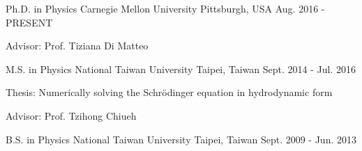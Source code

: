 


\begin{cventries}


\cventry
{Ph.D. in Physics} %
{Carnegie Mellon University} %
{Pittsburgh, USA} %
{Aug. 2016 - PRESENT} %
{ %
\begin{cvitems}
\item {Advisor: Prof. Tiziana Di Matteo}
\end{cvitems}
}

\vspace{-6mm}

\cventry
{M.S. in Physics} %
{National Taiwan University} %
{Taipei, Taiwan} %
{Sept. 2014 - Jul. 2016} %
{ %
\begin{cvitems}
\item {Thesis: Numerically solving the Schrödinger equation in hydrodynamic form}
\item {Advisor: Prof. Tzihong Chiueh }
\end{cvitems}
}

\vspace{-6mm}

\cventry
{B.S. in Physics} %
{National Taiwan University} %
{Taipei, Taiwan} %
{Sept. 2009 - Jun. 2013} %
{%
}



\end{cventries}